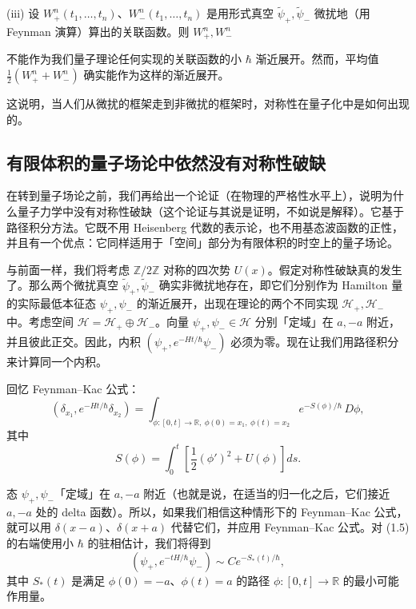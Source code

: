 (iii) 设 $W^n_+(t_1,\dots,t_n)$、$W^n_-(t_1,\dots,t_n)$ 是用形式真空 $\widetilde{\psi}_+,\widetilde{\psi}_-$ 微扰地（用 Feynman 演算）算出的关联函数。则 $W^n_+,W^n_-$

不能作为我们量子理论任何实现的关联函数的小 $\hbar$ 渐近展开。然而，平均值 $\frac12(W^n_++W^n_-)$ 确实能作为这样的渐近展开。

这说明，当人们从微扰的框架走到非微扰的框架时，对称性在量子化中是如何出现的。

\subsection{有限体积的量子场论中依然没有对称性破缺}

在转到量子场论之前，我们再给出一个论证（在物理的严格性水平上），说明为什么量子力学中没有对称性破缺（这个论证与其说是证明，不如说是解释）。它基于路径积分方法。它既不用 Heisenberg 代数的表示论，也不用基态波函数的正性，并且有一个优点：它同样适用于「空间」部分为有限体积的时空上的量子场论。

与前面一样，我们将考虑 $\mathbb{Z}/2\mathbb{Z}$ 对称的四次势 $U(x)$。假定对称性破缺真的发生了。那么两个微扰真空 $\widetilde{\psi}_+,\widetilde{\psi}_-$ 确实非微扰地存在，即它们分别作为 Hamilton 量的实际最低本征态 $\psi_+,\psi_-$ 的渐近展开，出现在理论的两个不同实现 $\mathcal{H}_+,\mathcal{H}_-$ 中。考虑空间 $\mathcal{H}=\mathcal{H}_+\oplus\mathcal{H}_-$。向量 $\psi_+,\psi_-\in\mathcal{H}$ 分别「定域」在 $a,-a$ 附近，并且彼此正交。因此，内积 $(\psi_+,e^{-Ht/\hbar}\psi_-)$ 必须为零。现在让我们用路径积分来计算同一个内积。

回忆 Feynman–Kac 公式：
\begin{equation}
  \tag{1.5}
  \label{eq:1-5}
  (\delta_{x_1},e^{-Ht/\hbar}\delta_{x_2})
  =\int_{\phi:[0,t]\to\mathbb{R},\ \phi(0)=x_1,\ \phi(t)=x_2} e^{-S(\phi)/\hbar}\,D\phi,
\end{equation}
其中
\begin{equation}
  \tag{1.6}
  \label{eq:1-6}
  S(\phi)=\int_0^t\left[\frac12(\phi')^2+U(\phi)\right]ds.
\end{equation}

态 $\psi_+,\psi_-$「定域」在 $a,-a$ 附近（也就是说，在适当的归一化之后，它们接近 $a,-a$ 处的 delta 函数）。所以，如果我们相信这种情形下的 Feynman–Kac 公式，就可以用 $\delta(x-a)$、$\delta(x+a)$ 代替它们，并应用 Feynman–Kac 公式。对 (1.5) 的右端使用小 $\hbar$ 的驻相估计，我们将得到
\begin{equation}
  \tag{1.7}
  \label{eq:1-7}
  (\psi_+,e^{-tH/\hbar}\psi_-)\sim Ce^{-S_*(t)/\hbar},
\end{equation}
其中 $S_*(t)$ 是满足 $\phi(0)=-a$、$\phi(t)=a$ 的路径 $\phi:[0,t]\to\mathbb{R}$ 的最小可能作用量。

